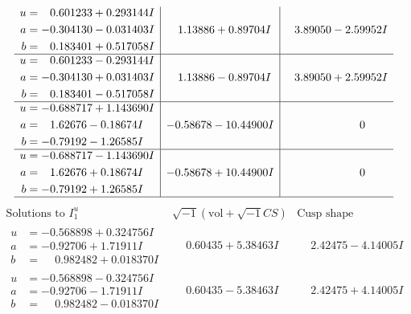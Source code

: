 \documentclass[1p]{elsarticle_modified}
\theoremstyle{definition}
\newcommand{\I}{\sqrt{-1}}
\begin{document}
$$\begin{array}{c|c|c}
\begin{aligned}
u &= \phantom{-}0.601233 + 0.293144 I \\
a &= -0.304130 - 0.031403 I \\
b &= \phantom{-}0.183401 + 0.517058 I\end{aligned}
 & \phantom{-}1.13886 + 0.89704 I & \phantom{-}3.89050 - 2.59952 I \\ \hline\begin{aligned}
u &= \phantom{-}0.601233 - 0.293144 I \\
a &= -0.304130 + 0.031403 I \\
b &= \phantom{-}0.183401 - 0.517058 I\end{aligned}
 & \phantom{-}1.13886 - 0.89704 I & \phantom{-}3.89050 + 2.59952 I \\ \hline\begin{aligned}
u &= -0.688717 + 1.143690 I \\
a &= \phantom{-}1.62676 - 0.18674 I \\
b &= -0.79192 - 1.26585 I\end{aligned}
 & -0.58678 - 10.44900 I & \phantom{-0.000000 } 0 \\ \hline\begin{aligned}
u &= -0.688717 - 1.143690 I \\
a &= \phantom{-}1.62676 + 0.18674 I \\
b &= -0.79192 + 1.26585 I\end{aligned}
 & -0.58678 + 10.44900 I & \phantom{-0.000000 } 0\\
 \hline 
 \end{array}$$\newpage$$\begin{array}{c|c|c}  
\text{Solutions to }I^u_{1}& \I (\text{vol} + \sqrt{-1}CS) & \text{Cusp shape}\\
 \hline 
\begin{aligned}
u &= -0.568898 + 0.324756 I \\
a &= -0.92706 + 1.71911 I \\
b &= \phantom{-}0.982482 + 0.018370 I\end{aligned}
 & \phantom{-}0.60435 + 5.38463 I & \phantom{-}2.42475 - 4.14005 I \\ \hline\begin{aligned}
u &= -0.568898 - 0.324756 I \\
a &= -0.92706 - 1.71911 I \\
b &= \phantom{-}0.982482 - 0.018370 I\end{aligned}
 & \phantom{-}0.60435 - 5.38463 I & \phantom{-}2.42475 + 4.14005 I \\ \hline\begin{aligned}

\end{aligned}
\end{array}$$
\end{document}
